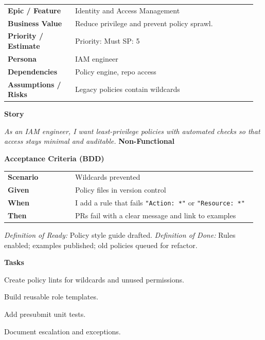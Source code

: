 \documentclass[11pt,letterpaper]{article}
\makeatletter
\newenvironment{kvtable}{%
  \begin{tabular}{@{}>{\bfseries\arraybackslash}p{0.26\linewidth} p{0.70\linewidth}@{}}
}{\end{tabular}}
\newenvironment{bdd}{%
  \begin{tabular}{@{}>{\bfseries\arraybackslash}p{0.26\linewidth} p{0.70\linewidth}@{}}
}{\end{tabular}}
\newcommand{\DoRDoD}[2]{%
  \vspace{0.35em}
  {\footnotesize\color{Muted}%
    \textit{Definition of Ready:} #1 \; \textbullet\;
    \textit{Definition of Done:} #2%
  }%
}
\newenvironment{storycard}[2]{%
  \begin{tcolorbox}[cloudcard, title={#1 --- #2}]%
}{\end{tcolorbox}}
\newcommand{\sectionlabel}[1]{\vspace{0.35em}\textbf{#1}\par}
\makeatother
\begin{document}
\begin{storycard}{CCS-10}{Ch. 10 — Access Policy Specification \& Enforcement}
\begin{kvtable}
Epic / Feature & Identity and Access Management\\
Business Value & Reduce privilege and prevent policy sprawl.\\
Priority / Estimate & Priority: Must \quad SP: 5\\
Persona & IAM engineer\\
Dependencies & Policy engine, repo access\\
Assumptions / Risks & Legacy policies contain wildcards\\
\end{kvtable}
\sectionlabel{Story}
\textit{As an IAM engineer, I want least-privilege policies with automated checks so that access stays minimal and auditable.}
\sectionlabel{Non-Functional}\;
\sectionlabel{Acceptance Criteria (BDD)}
\begin{bdd}
Scenario & Wildcards prevented\\
Given & Policy files in version control\\
When & I add a rule that fails \texttt{"Action: *"} or \texttt{"Resource: *"}\\
Then & PRs fail with a clear message and link to examples\\
\end{bdd}
\DoRDoD{Policy style guide drafted.}{Rules enabled; examples published; old policies queued for refactor.}
\sectionlabel{Tasks}
\begin{checklist}
\item Create policy lints for wildcards and unused permissions.
\item Build reusable role templates.
\item Add presubmit unit tests.
\item Document escalation and exceptions.
\end{checklist}
\end{storycard}
\end{document}
